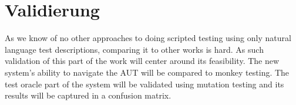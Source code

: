 \section{Validierung}

As we know of no other approaches to doing scripted testing using only natural language test descriptions, comparing it to other works is hard.
As such validation of this part of the work will center around its feasibility.
The new system's ability to navigate the AUT will be compared to monkey testing.
The test oracle part of the system will be validated using mutation testing and its results will be captured in a confusion matrix.

\iffalse
\chapter{Execution}

\section{Riscs}

\section{Schedule}

\ganttset{%
    calendar week text={%
        \currentweek
    }%
}
\begin{ganttchart}[hgrid,
time slot format=isodate,
    x unit=2pt,]{2023-06-12}{2023-12-11}
    \gantttitlecalendar{year, month, week}\\
    \ganttbar{Lit. Research}{2023-06-12}{2023-06-26} \\%
    \ganttgroup{Implementation}{2023-06-26}{2023-08-21} \\
    \ganttbar{AUT}{2023-06-26}{2023-07-24} \\%
    \ganttbar{Implementation}{2023-07-24}{2023-08-21} \\%
    \ganttgroup{Validation}{2023-08-21}{2023-10-02} \\
    \ganttbar{Design Tests}{2023-08-21}{2023-09-04} \\%
    \ganttbar{GPT3}{2023-09-04}{2023-09-11} \\%
    \ganttbar{GPT4}{2023-09-11}{2023-09-18} \\%
    \ganttbar{Monkey Testing}{2023-09-18}{2023-10-02} \\%
    \ganttgroup{Documentation}{2023-10-02}{2023-11-27} \\%
    \ganttbar{Writing}{2023-10-02}{2023-11-13} \\%
    \ganttbar{Finalize}{2023-11-13}{2023-11-27} \\%
    \ganttbar{Buffer}{2023-11-27}{2023-12-11}%
\end{ganttchart}
\fi

